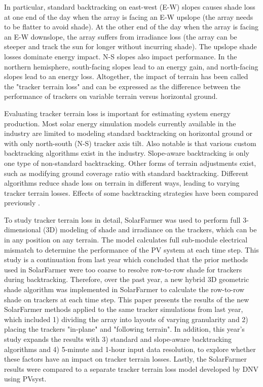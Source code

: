\documentclass[conference]{IEEEtran}
\begin{document}
In particular, standard backtracking on east-west (E-W) slopes causes shade loss at one end of the day when the array is facing an E-W upslope (the array needs to be flatter to avoid shade). At the other end of the day when the array is facing an E-W downslope, the array suffers from irradiance loss (the array can be steeper and track the sun for longer without incurring shade). The upslope shade losses dominate energy impact. N-S slopes also impact performance. In the northern hemisphere, south-facing slopes lead to an energy gain, and north-facing slopes lead to an energy loss. Altogether, the impact of terrain has been called the "tracker terrain loss" and can be expressed as the difference between the performance of trackers on variable terrain versus horizontal ground. 

Evaluating tracker terrain loss is important for estimating system energy production. Most solar energy simulation models currently available in the industry are limited to modeling standard backtracking on horizontal ground or with only north-south (N-S) tracker axis tilt. Also notable is that various custom backtracking algorithms exist in the industry. Slope-aware backtracking is only one type of non-standard backtracking. Other forms of terrain adjustments exist, such as modifying ground coverage ratio with standard backtracking. Different algorithms reduce shade loss on terrain in different ways, leading to varying tracker terrain losses. Effects of some backtracking strategies have been compared previously \cite{Anderson_9300438}.

To study tracker terrain loss in detail, SolarFarmer \cite{Mikofski_8547323} was used to perform full 3-dimensional (3D) modeling of shade and irradiance on the trackers, which can be in any position on any terrain. The model calculates full sub-module electrical mismatch to determine the performance of the PV system at each time step. This study is a continuation from last year \cite{Mikofski_9300381} which concluded that the prior methods used in SolarFarmer were too coarse to resolve row-to-row shade for trackers during backtracking. Therefore, over the past year, a new hybrid 3D geometric shade algorithm was implemented in SolarFarmer to calculate the row-to-row shade on trackers at each time step. This paper presents the results of the new SolarFarmer methods applied to the same tracker simulations from last year, which included 1) dividing the array into layouts of varying granularity and 2) placing the trackers "in-plane" and "following terrain". In addition, this year's study expands the results with 3) standard and slope-aware backtracking algorithms and 4) 5-minute and 1-hour input data resolution, to explore whether these factors have an impact on tracker terrain losses. Lastly, the SolarFarmer results were compared to a separate tracker terrain loss model developed by DNV using PVsyst. 
\end{document}

